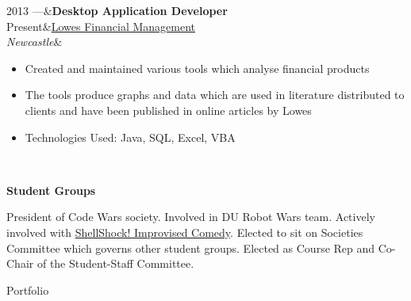 \documentclass[hidelinks, 12pt, a4paper]{article}
\newcommand{\smitem}[1]{\item {\small {#1}}}
\newenvironment{bullets}{\begin{minipage}[t]{\linewidth}\begin{itemize}[leftmargin=2em,label=-,nosep]}{\end{itemize}\end{minipage}\vspace{5pt}}
\newenvironment{sectionitem}{\vspace{6pt}\noindent\tabularx{\linewidth}{p{70pt}X}}{\endtabularx}
\newcommand{\sectionheader}[1]{
	\vspace{6pt}
	{
		\noindent
		\hspace{3pt}
		\Large\textbf{#1}}}
\begin{document}
\begin{minipage}{0.6\textwidth}
		\begin{sectionitem}
			2013 ---&\textbf{Desktop Application Developer}\\
			Present&\href{http://www.lowes.co.uk}{Lowes Financial Management}\\
			\emph{Newcastle}&\begin{bullets}
				\smitem{Created and maintained various tools which analyse financial products}
				\smitem{The tools produce graphs and data which are used in literature distributed to clients and have been published in online articles by Lowes}
				\smitem{Technologies Used: Java, SQL, Excel, VBA}
			\end{bullets}\\
		\end{sectionitem}
	
		\sectionheader{Student Groups}
		\vspace{4pt}
		
		President of Code Wars society. Involved in DU Robot Wars team. Actively involved with \href{http://community.dur.ac.uk/dur.improv/}{ShellShock! Improvised Comedy}. Elected to sit on Societies Committee which governs other student groups. Elected as Course Rep and Co-Chair of the Student-Staff Committee.
	\end{minipage}

	\newpage
	
	\vspace*{12pt}
	
	\begin{center}
		\Huge Portfolio
	\end{center}
	
\end{document}
